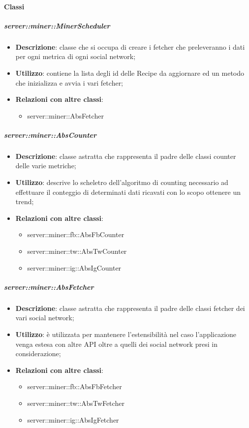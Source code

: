 \paragraph{Classi} %
		\subparagraph{server::miner::MinerScheduler} %
		\label{subp:server_miner_MinerScheduler}
			\begin{itemize}
				\item \textbf{Descrizione}: classe che si occupa di creare i fetcher che preleveranno i dati per ogni metrica di ogni social network;
				\item \textbf{Utilizzo}: contiene la lista degli id delle Recipe da aggiornare ed un metodo che inizializza e avvia i vari fetcher;
				\item \textbf{Relazioni con altre classi}:
					\begin{itemize}
						\item server::miner::AbsFetcher
					\end{itemize}
			\end{itemize}

		\subparagraph{server::miner::AbsCounter} %
		\label{subp:server_miner_AbsCounter}
			\begin{itemize}
				\item \textbf{Descrizione}: classe astratta che rappresenta il padre delle classi counter delle varie metriche;
				\item \textbf{Utilizzo}: descrive lo scheletro dell'algoritmo di counting necessario ad effettuare il conteggio di determinati dati ricavati con lo scopo ottenere un trend;
				\item \textbf{Relazioni con altre classi}:
					\begin{itemize}
						\item server::miner::fb::AbsFbCounter
						\item server::miner::tw::AbsTwCounter
						\item server::miner::ig::AbsIgCounter
					\end{itemize}
			\end{itemize}

		\subparagraph{server::miner::AbsFetcher} %
		\label{subp:server_miner_AbsFetcher}
				\begin{itemize}
				\item \textbf{Descrizione}: classe astratta che rappresenta il padre delle classi fetcher dei vari social network;
				\item \textbf{Utilizzo}: è utilizzata per mantenere l'estensibilità nel caso l'applicazione venga estesa con altre API  oltre a quelli dei social network presi in considerazione;
				\item \textbf{Relazioni con altre classi}:
					\begin{itemize}
						\item server::miner::fb::AbsFbFetcher
						\item server::miner::tw::AbsTwFetcher
						\item server::miner::ig::AbsIgFetcher
					\end{itemize}
			\end{itemize}

